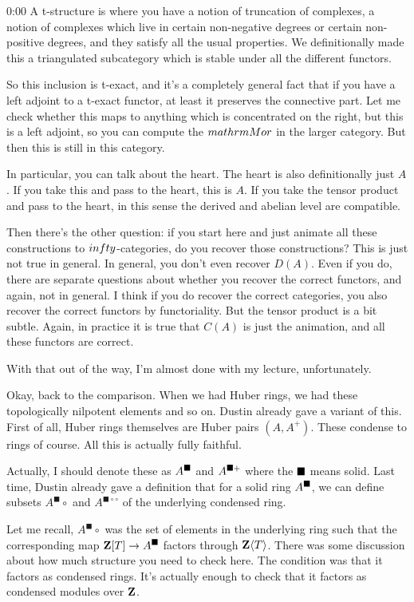 \begin{unfinished}{0:00}
A t-structure is where you have a notion of truncation of complexes, a notion of complexes which live in certain non-negative degrees or certain non-positive degrees, and they satisfy all the usual properties. We definitionally made this a triangulated subcategory which is stable under all the different functors.

So this inclusion is t-exact, and it's a completely general fact that if you have a left adjoint to a t-exact functor, at least it preserves the connective part. Let me check whether this maps to anything which is concentrated on the right, but this is a left adjoint, so you can compute the $\\mathrm{Mor}$ in the larger category. But then this is still in this category.

In particular, you can talk about the heart. The heart is also definitionally just $A$. If you take this and pass to the heart, this is $A$. If you take the tensor product and pass to the heart, in this sense the derived and abelian level are compatible.

Then there's the other question: if you start here and just animate all these constructions to $\\infty$-categories, do you recover those constructions? This is just not true in general. In general, you don't even recover $D(A)$. Even if you do, there are separate questions about whether you recover the correct functors, and again, not in general. I think if you do recover the correct categories, you also recover the correct functors by functoriality. But the tensor product is a bit subtle. Again, in practice it is true that $C(A)$ is just the animation, and all these functors are correct.

With that out of the way, I'm almost done with my lecture, unfortunately.

Okay, back to the comparison. When we had Huber rings, we had these topologically nilpotent elements and so on. Dustin already gave a variant of this. First of all, Huber rings themselves are Huber pairs $(A, A^+)$. These condense to rings of course. All this is actually fully faithful.

Actually, I should denote these as $A^\blacksquare$ and $A^{\blacksquare+}$ where the $\blacksquare$ means solid. Last time, Dustin already gave a definition that for a solid ring $A^\blacksquare$, we can define subsets $A^\blacksquare \circ$ and $A^{\blacksquare \circ\circ}$ of the underlying condensed ring.

Let me recall, $A^\blacksquare \circ$ was the set of elements in the underlying ring such that the corresponding map $\mathbf Z[T] \to A^\blacksquare$ factors through $\mathbf Z\langle T \rangle$. There was some discussion about how much structure you need to check here. The condition was that it factors as condensed rings. It's actually enough to check that it factors as condensed modules over $\mathbf Z$.


\end{unfinished}
